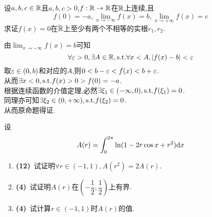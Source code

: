 \documentclass{ctexart}
\begin{document}
\begin{problem}[5.(10\songti{分})]
    设$a,b,c\in\mathbb{R}$且$a,b,c>0$,$f:\mathbb{R}\to\mathbb{R}$在$\mathbb{R}$上连续,且$$f(0)=-a,\lim_{x\to-\infty}f(x)=b,\lim_{x\to+\infty}f(x)=c$$求证$f(x)=0$在$\mathbb{R}$上至少有两个不相等的实根$r_1,r_2$.
\end{problem}
\begin{solution}[Proof.]
    由$\displaystyle\lim_{x\to-\infty}f(x)=b$可知
    $$\forall\varepsilon>0,\exists A\in\mathbb{R},\text{s.t.}\forall x<A,\left|f(x)-b\right|<\varepsilon$$
    取$\varepsilon\in(0,b)$和对应的$A$,则$0<b-\varepsilon<f(x)<b+\varepsilon$.\\
    从而$\exists x<0,\text{s.t.} f(x)>0>f(0)=-a$.\\
    根据连续函数的介值定理,必然$\exists\xi_1\in(-\infty,0),\text{s.t.} f(\xi_1)=0$.\\
    同理亦可知$\exists\xi_2\in(0,+\infty),\text{s.t.} f(\xi_2)=0$.\\
    从而原命题得证.
\end{solution}
\begin{problem}[6.(20\songti{分})]
    设$$A(r)=\int_0^{2\pi}\ln(1-2r\cos x+r^2)\mathrm{d} x$$
    \begin{enumerate}[label=\textbf{(\arabic*)},leftmargin=*]
        \item \textbf{(12)}\ 试证明$\displaystyle\forall r\in(-1,1),A(r^2)=2A(r)$.
        \item \textbf{(4)}\ 试证明$A(r)$在$\left(-\dfrac{1}{2},\dfrac{1}{2}\right)$上有界.
        \item \textbf{(4)}\ 试计算$r\in(-1,1)$时$A(r)$的值.
    \end{enumerate}
\end{problem}
\end{document}
